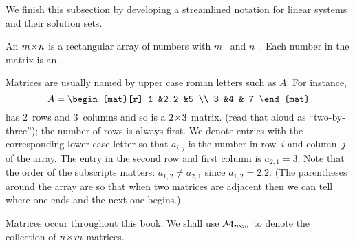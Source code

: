 We finish this subsection by developing a streamlined 
notation for linear systems 
and their solution sets.

\begin{definition}
An \( m \! \times \! n \) 
is a rectangular array of numbers
with \( m \)~ 
and \( n \)~.
Each number in the matrix is an 
.
\end{definition}

Matrices are usually named by upper case roman letters such as 
\( A \).
For instance,
\begin{equation*}
  A=
  \begin{mat}[r]
    1  &2.2  &5  \\
    3  &4    &-7
  \end{mat}
\end{equation*}
has $2$~rows and $3$~columns and so
is a \( 2 \! \times \! 3 \) matrix.
(read that aloud as ``two-by-three'');
the number of rows is always first.
We denote entries with the corresponding lower-case letter
so that $a_{i,j}$
is the number in row~$i$ and column~$j$ of the array.
The entry in the second row and first column is \( a_{2,1}=3 \).
Note that the order of the subscripts matters: 
$a_{1,2}\neq a_{2,1}$ since \( a_{1,2}=2.2 \). 
(The parentheses around the array
are so that when 
two matrices are adjacent then
we can tell where one ends and the next one begins.)

Matrices occur throughout this book.
We shall use 
\( \mathcal{M}_{n \! \times \! m} \) to denote the collection of \( n \! \times \! m \)
matrices.

